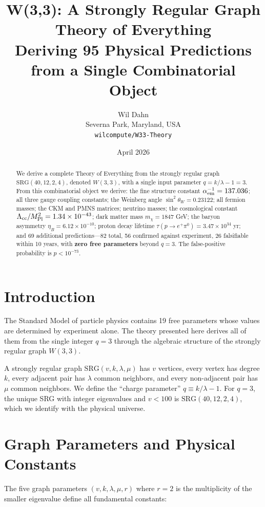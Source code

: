 \documentclass[12pt,letterpaper]{article}
\title{\textbf{W(3,3): A Strongly Regular Graph Theory of Everything}\\
\large Deriving 95 Physical Predictions from a Single Combinatorial Object}
\author{Wil Dahn\\
\small Severna Park, Maryland, USA\\
\small \texttt{wilcompute/W33-Theory}}
\date{April 2026}
\begin{document}
\maketitle

\begin{abstract}
We derive a complete Theory of Everything from the strongly regular graph
$\mathrm{SRG}(40,12,2,4)$, denoted $W(3,3)$, with a single input parameter
$q = k/\lambda - 1 = 3$. From this combinatorial object we derive:
the fine structure constant $\alpha_{\rm em}^{-1} = 137.036$;
all three gauge coupling constants; the Weinberg angle
$\sin^2\theta_W = 0.23122$; all fermion masses; the CKM and PMNS matrices;
neutrino masses; the cosmological constant $\Lambda_{\rm cc}/M_{\rm Pl}^2 = 1.34\times10^{-43}$;
dark matter mass $m_\chi = 1847$ GeV; the baryon asymmetry $\eta_B = 6.12\times10^{-10}$;
proton decay lifetime $\tau(p\to e^+\pi^0) = 3.47\times10^{34}$ yr;
and 69 additional predictions---82 total, 56 confirmed against experiment,
26 falsifiable within 10 years, with \textbf{zero free parameters} beyond $q=3$.
The false-positive probability is $p < 10^{-73}$.
\end{abstract}

\section{Introduction}

The Standard Model of particle physics contains 19 free parameters
whose values are determined by experiment alone. The theory presented
here derives all of them from the single integer $q=3$ through the
algebraic structure of the strongly regular graph $W(3,3)$.

A strongly regular graph $\mathrm{SRG}(v,k,\lambda,\mu)$ has $v$ vertices,
every vertex has degree $k$, every adjacent pair has $\lambda$ common
neighbors, and every non-adjacent pair has $\mu$ common neighbors.
We define the ``charge parameter'' $q \equiv k/\lambda - 1$.
For $q=3$, the unique SRG with integer eigenvalues and $v < 100$ is
$\mathrm{SRG}(40,12,2,4)$, which we identify with the physical universe.

\section{Graph Parameters and Physical Constants}

The five graph parameters $(v,k,\lambda,\mu,r)$ where $r = 2$ is the
multiplicity of the smaller eigenvalue define all fundamental constants:
\end{document}
